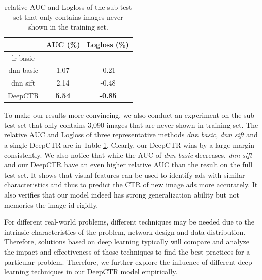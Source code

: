 \documentclass{sig-alternate}
\begin{document}
\begin{table}
	\centering
	\caption{relative AUC and Logloss of the sub test set that only contains images never shown in the training set.}
	\label{table:subset}
	\begin{tabular}{|c|c|c|} \hline
		 & AUC (\%) & Logloss (\%)\\ \hline
		lr basic & - & - \\ \hline
		dnn basic & 1.07 & -0.21 \\ \hline
		dnn sift & 2.14 & -0.48  \\ \hline
		DeepCTR & \textbf{5.54} & \textbf{-0.85} \\ \hline
	\end{tabular}
\end{table}
To make our results more convincing, we also conduct an experiment on the sub test set that only contains 3,090 images that are never shown in training set. The relative AUC and Logloss of three representative methods \emph{dnn basic}, \emph{dnn sift} and a single DeepCTR are in Table \ref{table:subset}. Clearly, our DeepCTR wins by a large margin consistently. We also notice that while the AUC of \emph{dnn basic} decreases, \emph{dnn sift} and our DeepCTR have an even higher relative AUC than the result on the full test set. It shows that visual features can be used to identify ads with similar characteristics and thus to predict the CTR of new image ads  more accurately.   It also verifies that our model indeed has strong generalization ability but not  memories the image id rigidly.   


For different real-world problems, different techniques may be needed due to the intrinsic characteristics of the problem, network design and data distribution. Therefore, solutions based on deep learning typically will compare and analyze the impact and effectiveness of those techniques to find the best practices for a particular problem. Therefore,
we further  explore the influence of different deep learning techniques in our DeepCTR model empirically. 
\end{document}
